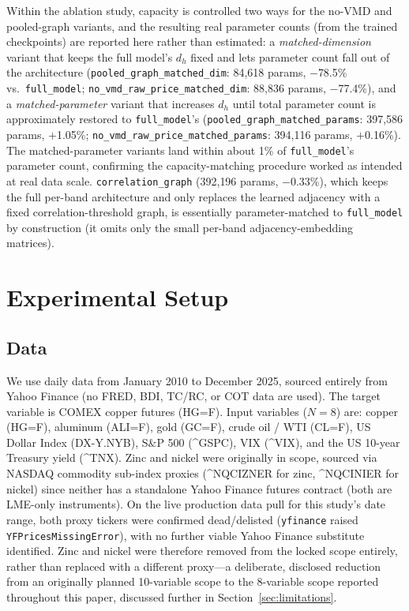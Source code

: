 \documentclass[journal]{IEEEtran}
\begin{document}
Within the ablation study, capacity is controlled two ways for the no-VMD and pooled-graph variants, and the resulting real parameter counts (from the trained checkpoints) are reported here rather than estimated: a \emph{matched-dimension} variant that keeps the full model's $d_h$ fixed and lets parameter count fall out of the architecture (\texttt{pooled\_graph\_matched\_dim}: 84{,}618 params, $-$78.5\% vs.\ \texttt{full\_model}; \texttt{no\_vmd\_raw\_price\_matched\_dim}: 88{,}836 params, $-$77.4\%), and a \emph{matched-parameter} variant that increases $d_h$ until total parameter count is approximately restored to \texttt{full\_model}'s (\texttt{pooled\_graph\_matched\_params}: 397{,}586 params, $+$1.05\%; \texttt{no\_vmd\_raw\_price\_matched\_params}: 394{,}116 params, $+$0.16\%). The matched-parameter variants land within about 1\% of \texttt{full\_model}'s parameter count, confirming the capacity-matching procedure worked as intended at real data scale. \texttt{correlation\_graph} (392{,}196 params, $-$0.33\%), which keeps the full per-band architecture and only replaces the learned adjacency with a fixed correlation-threshold graph, is essentially parameter-matched to \texttt{full\_model} by construction (it omits only the small per-band adjacency-embedding matrices).

\FloatBarrier

\section{Experimental Setup}
\label{sec:experiments}

\subsection{Data}

We use daily data from January 2010 to December 2025, sourced entirely from Yahoo Finance (no FRED, BDI, TC/RC, or COT data are used). The target variable is COMEX copper futures (HG=F). Input variables ($N=8$) are: copper (HG=F), aluminum (ALI=F), gold (GC=F), crude oil / WTI (CL=F), US Dollar Index (DX-Y.NYB), S\&P 500 (\^{}GSPC), VIX (\^{}VIX), and the US 10-year Treasury yield (\^{}TNX). Zinc and nickel were originally in scope, sourced via NASDAQ commodity sub-index proxies (\^{}NQCIZNER for zinc, \^{}NQCINIER for nickel) since neither has a standalone Yahoo Finance futures contract (both are LME-only instruments). On the live production data pull for this study's date range, both proxy tickers were confirmed dead/delisted (\texttt{yfinance} raised \texttt{YFPricesMissingError}), with no further viable Yahoo Finance substitute identified. Zinc and nickel were therefore removed from the locked scope entirely, rather than replaced with a different proxy---a deliberate, disclosed reduction from an originally planned 10-variable scope to the 8-variable scope reported throughout this paper, discussed further in Section~\ref{sec:limitations}.
\end{document}
